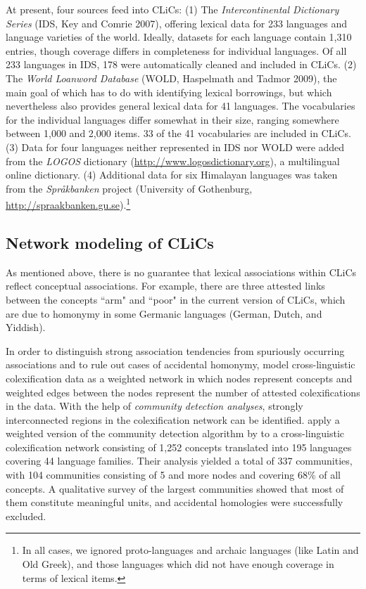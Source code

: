 At present, four sources feed into CLiCs: (1) The \emph{Intercontinental Dictionary Series} (IDS, Key and
Comrie 2007), offering lexical data for 233 languages and language varieties of the world. Ideally,
datasets for each language contain 1,310 entries, though coverage differs in completeness for
individual languages. Of all 233 languages in IDS, 178 were automatically cleaned and included in
CLiCs. (2) The \emph{World Loanword Database} (WOLD, Haspelmath and Tadmor 2009), the main goal of which
has to do with identifying lexical borrowings, but which nevertheless also provides general lexical
data for 41 languages. The vocabularies for the individual languages differ somewhat in their size,
ranging somewhere between 1,000 and 2,000 items. 33 of the 41 vocabularies are included in CLiCs.
(3) Data for four languages neither represented in IDS nor WOLD were added from the \emph{LOGOS} dictionary
(\url{http://www.logosdictionary.org}), a multilingual online dictionary. (4) Additional data for
six
Himalayan languages was taken from the \emph{Språkbanken} project (University of Gothenburg,
\url{http://spraakbanken.gu.se}).\footnote{In all cases, we ignored proto-languages and
archaic languages (like Latin and Old Greek), and those languages which
did not have enough coverage in terms of lexical items.}

\nocite{Wold2009}
\subsection{Network modeling of CLiCs}
As mentioned above, there is no guarantee that lexical associations within CLiCs reflect conceptual
associations. For example, there are three attested links between the concepts ``arm" and ``poor" in
the current version of CLiCs, which are due to homonymy in some Germanic languages (German, Dutch,
and Yiddish).
 
In order to distinguish strong association tendencies from spuriously occurring associations and to
rule out cases of accidental homonymy,  model cross-linguistic colexification
data as a weighted network in which nodes represent concepts and weighted edges between the nodes
represent the number of attested colexifications in the data.  With the help of \emph{community
detection analyses}, strongly interconnected regions in the colexification network can be
identified.  apply a weighted version of the community detection algorithm by
 to a cross-linguistic colexification network consisting of 1,252 concepts
translated into 195 languages covering 44 language families. Their analysis yielded a total of 337
communities, with 104 communities consisting of 5 and more nodes and covering 68\% of all concepts.
A qualitative survey of the largest communities showed that most of them constitute meaningful
units, and accidental homologies were successfully excluded.


